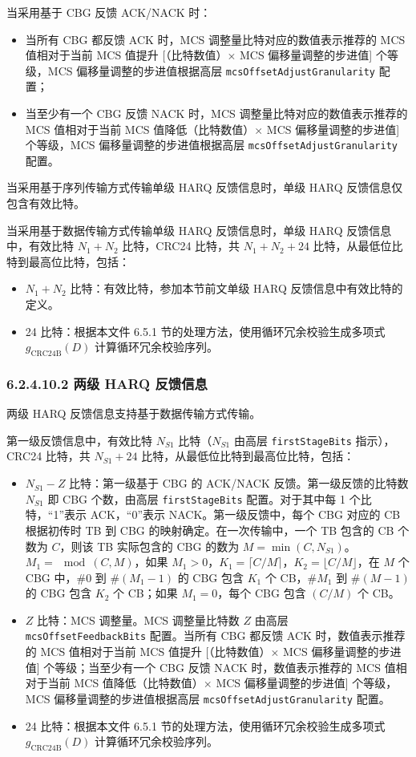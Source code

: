 \documentclass[11pt,a4paper]{ctexart}
\begin{document}
当采用基于 CBG 反馈 ACK/NACK 时：
\begin{itemize}[nosep]
  \item 当所有 CBG 都反馈 ACK 时，MCS 调整量比特对应的数值表示推荐的 MCS 值相对于当前 MCS 值提升 [（比特数值）$\times$ MCS 偏移量调整的步进值] 个等级，MCS 偏移量调整的步进值根据高层 \texttt{mcsOffsetAdjustGranularity} 配置；
  \item 当至少有一个 CBG 反馈 NACK 时，MCS 调整量比特对应的数值表示推荐的 MCS 值相对于当前 MCS 值降低（比特数值）$\times$ MCS 偏移量调整的步进值] 个等级，MCS 偏移量调整的步进值根据高层 \texttt{mcsOffsetAdjustGranularity} 配置。
\end{itemize}

当采用基于序列传输方式传输单级 HARQ 反馈信息时，单级 HARQ 反馈信息仅包含有效比特。

当采用基于数据传输方式传输单级 HARQ 反馈信息时，单级 HARQ 反馈信息中，有效比特 $N_1 + N_2$ 比特，CRC24 比特，共 $N_1 + N_2 + 24$ 比特，从最低位比特到最高位比特，包括：
\begin{itemize}[nosep]
  \item $N_1 + N_2$ 比特：有效比特，参加本节前文单级 HARQ 反馈信息中有效比特的定义。
  \item 24 比特：根据本文件 6.5.1 节的处理方法，使用循环冗余校验生成多项式 $g_{\mathrm{CRC24B}}(D)$ 计算循环冗余校验序列。
\end{itemize}

\subsubsection{6.2.4.10.2 两级 HARQ 反馈信息}

两级 HARQ 反馈信息支持基于数据传输方式传输。

第一级反馈信息中，有效比特 $N_{S1}$ 比特（$N_{S1}$ 由高层 \texttt{firstStageBits} 指示），CRC24 比特，共 $N_{S1} + 24$ 比特，从最低位比特到最高位比特，包括：
\begin{itemize}[nosep]
  \item $N_{S1} - Z$ 比特：第一级基于 CBG 的 ACK/NACK 反馈。第一级反馈的比特数 $N_{S1}$ 即 CBG 个数，由高层 \texttt{firstStageBits} 配置。对于其中每 1 个比特，``1''表示 ACK，``0''表示 NACK。第一级反馈中，每个 CBG 对应的 CB 根据初传时 TB 到 CBG 的映射确定。在一次传输中，一个 TB 包含的 CB 个数为 $C$，则该 TB 实际包含的 CBG 的数为 $M = \min(C, N_{S1})$。$M_1 = \mod(C, M)$，如果 $M_1 > 0$，$K_1 = \lceil C/M \rceil$，$K_2 = \lfloor C/M \rfloor$，在 $M$ 个 CBG 中，\#0 到 \#$(M_1-1)$ 的 CBG 包含 $K_1$ 个 CB，\#$M_1$ 到 \#$(M-1)$ 的 CBG 包含 $K_2$ 个 CB；如果 $M_1 = 0$，每个 CBG 包含 $(C/M)$ 个 CB。
  \item $Z$ 比特：MCS 调整量。MCS 调整量比特数 $Z$ 由高层 \texttt{mcsOffsetFeedbackBits} 配置。当所有 CBG 都反馈 ACK 时，数值表示推荐的 MCS 值相对于当前 MCS 值提升 [（比特数值）$\times$ MCS 偏移量调整的步进值] 个等级；当至少有一个 CBG 反馈 NACK 时，数值表示推荐的 MCS 值相对于当前 MCS 值降低（比特数值）$\times$ MCS 偏移量调整的步进值] 个等级，MCS 偏移量调整的步进值根据高层 \texttt{mcsOffsetAdjustGranularity} 配置。
  \item 24 比特：根据本文件 6.5.1 节的处理方法，使用循环冗余校验生成多项式 $g_{\mathrm{CRC24B}}(D)$ 计算循环冗余校验序列。
\end{itemize}
\end{document}
